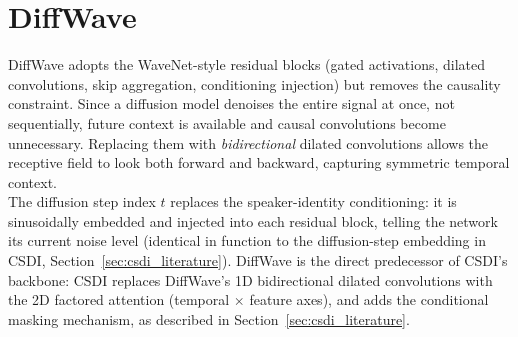 \section{DiffWave}

DiffWave \cite{kong2021diffwave} adopts the WaveNet-style residual blocks
(gated activations, dilated convolutions, skip aggregation, conditioning
injection) but removes the causality constraint. Since a diffusion model
denoises the entire signal at once, not sequentially, future context is
available and causal convolutions become unnecessary. Replacing them with
\textit{bidirectional} dilated convolutions allows the receptive field to
look both forward and backward, capturing symmetric temporal context.\\

The diffusion step index $t$ replaces the speaker-identity conditioning: it
is sinusoidally embedded and injected into each residual block, telling the
network its current noise level (identical in function to the diffusion-step
embedding in CSDI, Section~\ref{sec:csdi_literature}). DiffWave is the direct
predecessor of CSDI's backbone: CSDI replaces DiffWave's 1D bidirectional
dilated convolutions with the 2D factored attention (temporal $\times$
feature axes), and adds the conditional masking mechanism, as described in
Section~\ref{sec:csdi_literature}.